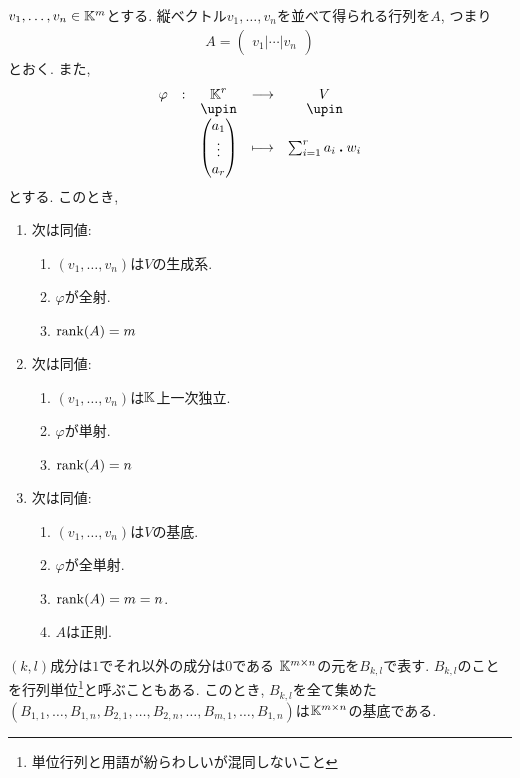 \begin{example}
  $v_1,\ldots,v_n\in \mathbb{K}^m$とする.
  縦ベクトル$v_1,\ldots,v_n$を並べて得られる行列を$A$,
  つまり
  \begin{align*}
    A=
    \begin{pmatrix}
      v_1|\cdots|v_n
    \end{pmatrix}
  \end{align*}
  とおく.
  また,
  \begin{align*}
    \shazo{\varphi}{\KK^r}{V}
          {\begin{pmatrix}a_1\\\vdots\\a_r\end{pmatrix}}{\sum_{i=1}^{r}a_i\act w_i}
  \end{align*}
  とする.  
  このとき,
  \begin{enumerate}
  \item 次は同値:
    \begin{enumerate}
      \item $(v_1,\ldots,v_n)$は$V$の生成系.
      \item $\varphi$が全射.
      \item $\operatorname{rank}(A)=m$
    \end{enumerate}
  \item 次は同値:
    \begin{enumerate}
      \item $(v_1,\ldots,v_n)$は$\mathbb{K}$上一次独立.
      \item $\varphi$が単射.
      \item $\operatorname{rank}(A)=n$
    \end{enumerate}
  \item 次は同値:
    \begin{enumerate}
      \item $(v_1,\ldots,v_n)$は$V$の基底.
      \item $\varphi$が全単射.
      \item $\operatorname{rank}(A)=m=n$.
      \item $A$は正則.
    \end{enumerate}
  \end{enumerate}
\end{example}


\begin{example}
  $(k,l)$成分は$1$でそれ以外の成分は$0$である
  $\mathbb{K}^{m\times n}$の元を$B_{k,l}$で表す.
  $B_{k,l}$のことを行列単位\footnote{単位行列と用語が紛らわしいが混同しないこと}と呼ぶこともある.
  このとき,
  $B_{k,l}$を全て集めた
  $(B_{1,1},\ldots,B_{1,n},B_{2,1},\ldots,B_{2,n},\ldots,B_{m,1},\ldots,B_{1,n})$は$\mathbb{K}^{m\times n}$の基底である.
\end{example}

